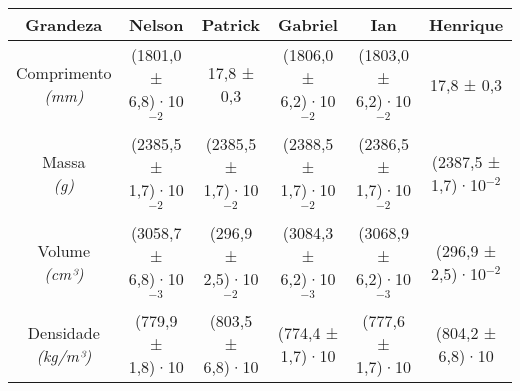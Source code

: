 \documentclass{article}
\begin{document}
\begin{table}[h!]
\centering
\begin{tabular}{c c c c c c }
\toprule
Grandeza & Nelson & Patrick & Gabriel & Ian & Henrique\\
\midrule
\shortstack{Comprimento\\\textit{(mm)}} & (1801,0 ± 6,8)·10$^{-2}$ & 17,8 ± 0,3 & (1806,0 ± 6,2)·10$^{-2}$ & (1803,0 ± 6,2)·10$^{-2}$ & 17,8 ± 0,3\\[4pt]
\shortstack{Massa\\\textit{(g)}} & (2385,5 ± 1,7)·10$^{-2}$ & (2385,5 ± 1,7)·10$^{-2}$ & (2388,5 ± 1,7)·10$^{-2}$ & (2386,5 ± 1,7)·10$^{-2}$ & (2387,5 ± 1,7)·10$^{-2}$\\[4pt]
\shortstack{Volume\\\textit{(cm³)}} & (3058,7 ± 6,8)·10$^{-3}$ & (296,9 ± 2,5)·10$^{-2}$ & (3084,3 ± 6,2)·10$^{-3}$ & (3068,9 ± 6,2)·10$^{-3}$ & (296,9 ± 2,5)·10$^{-2}$\\[4pt]
\shortstack{Densidade\\\textit{(kg/m³)}} & (779,9 ± 1,8)·10 & (803,5 ± 6,8)·10 & (774,4 ± 1,7)·10 & (777,6 ± 1,7)·10 & (804,2 ± 6,8)·10\\[4pt]
\bottomrule
\end{tabular}
\end{table}
\end{document}
